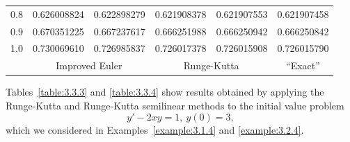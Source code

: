 \begin{examplesolution}
\begin{newtable}
\begin{center}
\begin{tabular}{|c|r|r|r|r|r|}
      0.8                       & 0.626008824                         & 0.622898279                      & 0.621908378                   & 0.621907553                    & 0.621907458                     \\
      0.9                       & 0.670351225                         & 0.667237617                      & 0.666251988                   & 0.666250942                    & 0.666250842                     \\
      1.0                       & 0.730069610                         & 0.726985837                      & 0.726017378                   & 0.726015908                    & 0.726015790                     \\
      \hline
                                & \multicolumn{2}{c|}{Improved Euler} & \multicolumn{2}{c|}{Runge-Kutta} & \multicolumn{1}{c|}{``Exact''} \\
      \hline
    \end{tabular}
  \end{center}
\end{newtable}
\end{examplesolution}

\begin{example}
  \label{example:3.3.4} \rm Tables~\ref{table:3.3.3} and \ref{table:3.3.4} show results obtained by
  applying the Runge-Kutta and Runge-Kutta semilinear methods to the initial value problem
  \[
    y'-2xy=1,\ y(0)=3,
  \]
  which we considered in Examples~\ref{example:3.1.4} and \ref{example:3.2.4}.
\end{example}

